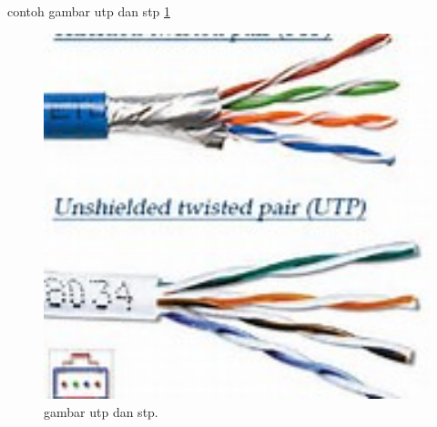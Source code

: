 	contoh gambar utp dan stp \ref{utp_stp}
	\begin{figure}[ht]
		\centerline{\includegraphics[width=1\textwidth]{figures/utp_stp.jpg}}
		\caption{gambar utp dan stp.}
		\label{utp_stp}
	\end{figure}

